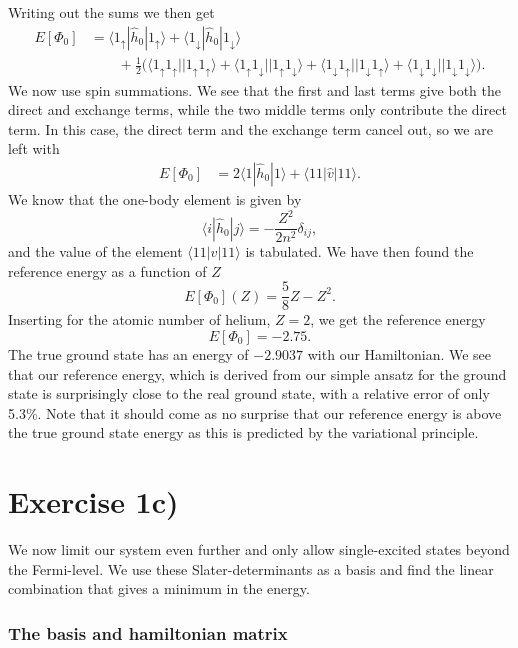 \documentclass[a4paper, 11pt, notitlepage, english]{article}
\newcommand{\brakket}[2]{\langle #1 || #2 \rangle}
\newcommand{\op}[1]{\hat{#1}}
\newcommand{\braopket}[3]{\langle #1 | {#2} | #3 \rangle}
\renewcommand{\d}{{\rm d}}
\renewcommand{\u}{\uparrow}
\renewcommand{\d}{\downarrow}
\begin{document}
\clearpage

Writing out the sums we then get
\begin{align*}
E[\Phi_0] &= \braopket{1_\u}{\op{h}_0}{1_\u} + \braopket{1_\d}{\op{h}_0}{1_\d} \\ &\qquad + \frac{1}{2}\big(\brakket{1_\u1_\u}{1_\u1_\u} + \brakket{1_\u1_\d}{1_\u1_\d} + \brakket{1_\d1_\u}{1_\d1_\u} + \brakket{1_\d1_\d}{1_\d1_\d}\big).
\end{align*}
We now use spin summations. We see that the first and last terms give both the direct and exchange terms, while the two middle terms only contribute the direct term. In this case, the direct term and the exchange term cancel out, so we are left with 
\begin{align*}
E[\Phi_0] &= 2\braopket{1}{\op{h}_0}{1} + \braopket{11}{\op{v}}{11}.
\end{align*}
We know that the one-body element is given by 
$$\braopket{i}{\op{h}_0}{j} = -\frac{Z^2}{2n^2}\delta_{ij},$$
and the value of the element $\braopket{11}{\op{v}}{11}$ is tabulated. We have then found the reference energy as a function of $Z$
$$E[\Phi_0](Z) = \frac{5}{8}Z - Z^2.$$
Inserting for the atomic number of helium, $Z=2$, we get the reference energy
$$E[\Phi_0] = -2.75.$$
The true ground state has an energy of $-2.9037$ with our Hamiltonian. We see that our reference energy, which is derived from our simple ansatz for the ground state is surprisingly close to the real ground state, with a relative error of only 5.3\%. Note that it should come as no surprise that our reference energy is above the true ground state energy as this is predicted by the variational principle.

\section*{Exercise 1c)}

We now limit our system even further and only allow single-excited states beyond the Fermi-level. We use these Slater-determinants as a basis and find the linear combination that gives a minimum in the energy.

\subsubsection*{The basis and hamiltonian matrix}
\end{document}
